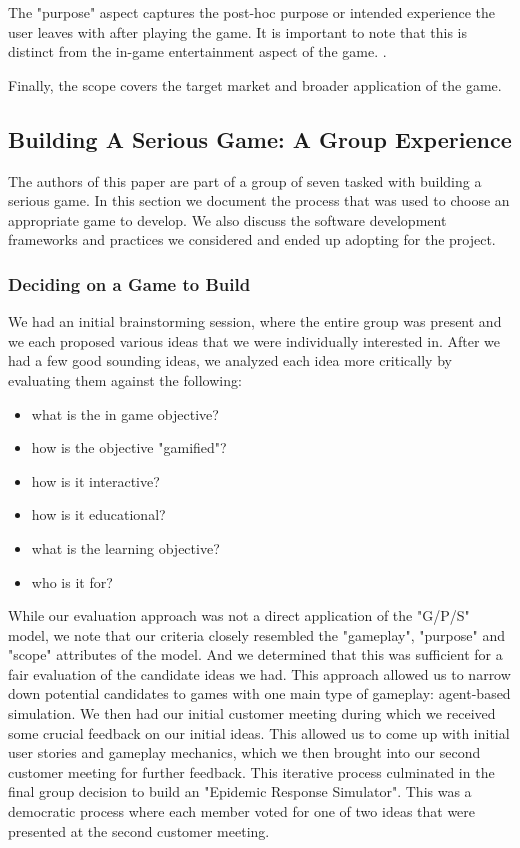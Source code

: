 \documentclass[11pt]{article}
\begin{document}
    The "purpose" aspect captures the post-hoc purpose or intended experience the user leaves with after playing the game. It is important to note that this is distinct from the in-game entertainment aspect of the game. \citet{classification}. 
    
    Finally, the scope covers the target market and broader application of the game.

    \subsection{Building A Serious Game: A Group Experience}
        The authors of this paper are part of a group of seven tasked with building a serious game. In this section we document the process that was used to choose an appropriate game to develop. We also discuss the software development frameworks and practices we considered and ended up adopting for the project.
        \subsubsection{Deciding on a Game to Build}
        We had an initial brainstorming session, where the entire group was present and we each proposed various ideas that we were individually interested in. After we had a few good sounding ideas, we analyzed each idea more critically by evaluating them against the following:
            \begin{itemize}
                \item what is the in game objective?
                \item how is the objective "gamified"?
                \item how is it interactive?
                \item how is it educational?
                \item what is the learning objective?
                \item who is it for?
            \end{itemize}

        While our evaluation approach was not a direct application of the "G/P/S" model, we note that our criteria closely resembled the "gameplay", "purpose" and "scope" attributes of the model. And we determined that this was sufficient for a fair evaluation of the candidate ideas we had. This approach allowed us to narrow down potential candidates to games with one main type of gameplay: agent-based simulation. We then had our initial customer meeting during which we received some crucial feedback on our initial ideas. This allowed us to come up with initial user stories and gameplay mechanics, which we then brought into our second customer meeting for further feedback. This iterative process culminated in the final group decision to build an "Epidemic Response Simulator". This was a democratic process where each member voted for one of two ideas that were presented at the second customer meeting.
\end{document}
